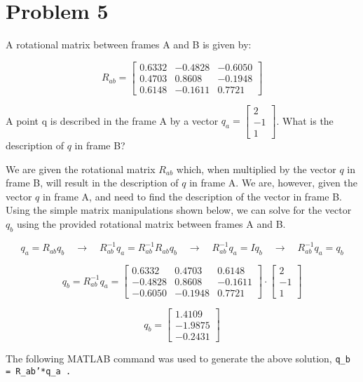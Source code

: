 \documentclass[10pt, oneside, letter]{article}
\begin{document}
\hrulefill
		
\section*{Problem 5}
	
		A rotational matrix between frames A and B is given by: 
		
		$$R_{ab} = \left[ \begin{array}{ccc}
		  0.6332 & -0.4828 & -0.6050 \\
		  0.4703 & 0.8608 & -0.1948 \\
		  0.6148 & -0.1611 & 0.7721
		\end{array} \right] $$
		
		A point q is described in the frame A by a vector $q_a =
		\left[ \begin{array}{r}
		  2 \\
		  -1 \\
		  1
		\end{array} \right]$. What is the description of $q$ in frame B? \rm
		
		We are given the rotational matrix $R_{ab}$ which, when multiplied by the vector $q$ in frame B, will result in the description of $q$ in frame A. We are, however, given the vector $q$ in frame A, and need to find the description of the vector in frame B. Using the simple matrix manipulations shown below, we can solve for the vector $q_b$ using the provided rotational matrix between frames A and B.
		
		$$q_a = R_{ab} q_b \quad \longrightarrow \quad R_{ab}^{-1} q_a = R_{ab}^{-1} R_{ab} q_b \quad \longrightarrow \quad R_{ab}^{-1} q_a = I q_b \quad \longrightarrow \quad R_{ab}^{-1} q_a = q_b $$
		
		$$q_b = R_{ab}^{-1} q_a = \left[ \begin{array}{ccc}
		  0.6332 & 0.4703 & 0.6148 \\
		  -0.4828 & 0.8608 & -0.1611 \\
		  -0.6050 & -0.1948 & 0.7721
		\end{array} \right] \cdot \left[ \begin{array}{r}
		  2 \\
		  -1 \\
		  1
		\end{array} \right]$$
		
		$$\boxed{q_b = \left[ \begin{array}{r}
		  1.4109 \\
		  -1.9875 \\
		  -0.2431
		\end{array} \right] }$$
		
		The following MATLAB command was used to generate the above solution, \tt q\_b = R\_ab'*q\_a \rm . 
			
		
		
	
\end{document}

